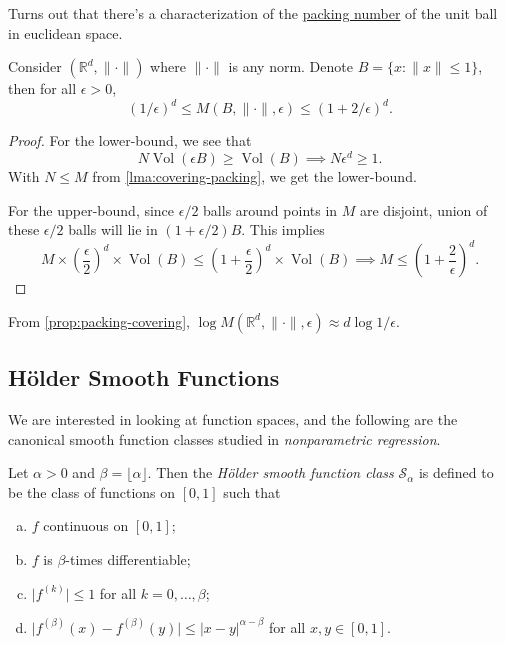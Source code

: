Turns out that there's a characterization of the \hyperref[def:packing-number]{packing number} of the unit ball in euclidean space.

\begin{proposition}\label{prop:packing-covering}
	Consider \((\mathbb{R} ^d, \lVert \cdot \rVert )\) where \(\lVert \cdot \rVert \) is any norm. Denote \(B = \{ x \colon \lVert x \rVert \leq 1 \} \), then for all \(\epsilon > 0\),
	\[
		(1 / \epsilon) ^d \leq M(B, \lVert \cdot \rVert , \epsilon ) \leq (1 + 2 / \epsilon )^d.
	\]
\end{proposition}
\begin{proof}
	For the lower-bound, we see that
	\[
		N \mathop{\mathrm{Vol}}(\epsilon B) \geq \mathop{\mathrm{Vol}}(B)
		\implies N \epsilon ^d \geq 1.
	\]
	With \(N \leq M\) from \autoref{lma:covering-packing}, we get the lower-bound.

	For the upper-bound, since \(\epsilon / 2\) balls around points in \(M\) are disjoint, union of these \(\epsilon / 2\) balls will lie in \((1 + \epsilon / 2)B\). This implies
	\[
		M \times \left( \frac{\epsilon}{2} \right) ^d \times \mathop{\mathrm{Vol}}(B)
		\leq \left( 1 + \frac{\epsilon}{2} \right) ^d \times \mathop{\mathrm{Vol}}(B)
		\implies M \leq \left( 1 + \frac{2}{\epsilon } \right) ^d.
	\]
\end{proof}

\begin{note}
	From \autoref{prop:packing-covering}, \(\log M(\mathbb{R} ^d, \lVert \cdot \rVert , \epsilon ) \approx d \log 1 / \epsilon \).
\end{note}

\subsection{Hölder Smooth Functions}
We are interested in looking at function spaces, and the following are the canonical smooth function classes studied in \emph{nonparametric regression}.

\begin{definition}\label{def:Holder-smooth-function-class}
	Let \(\alpha > 0\) and \(\beta = \lfloor \alpha \rfloor\). Then the \emph{Hölder smooth function class} \(\mathcal{S} _\alpha \) is defined to be the class of functions on \([0, 1]\) such that
	\begin{enumerate}[(a)]
		\item \(f\) continuous on \([0, 1]\);
		\item \(f\) is \(\beta \)-times differentiable;
		\item \(\vert f^{(k)} \vert \leq 1\) for all \(k = 0, \dots , \beta \);
		\item \(\vert f^{(\beta )}(x) - f^{(\beta )}(y) \vert \leq \vert x - y \vert ^{\alpha - \beta }\) for all \(x, y \in [0, 1]\).
	\end{enumerate}
\end{definition}

